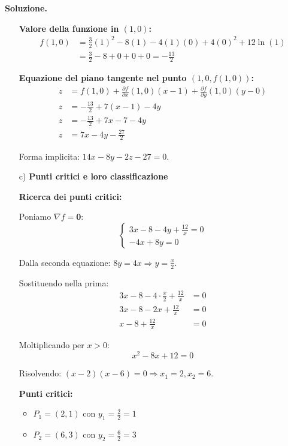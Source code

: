 \documentclass[12pt, a4paper]{article}
\newenvironment{solution}{%
    \par\noindent\textbf{Soluzione.}\medskip\par
    \normalfont
}{\par\bigskip}
\begin{document}
\begin{solution}
\begin{enumerate}
    \textbf{Valore della funzione in $(1,0)$:}
    \begin{align}
        f(1,0) &= \frac{3}{2}(1)^2 - 8(1) - 4(1)(0) + 4(0)^2 + 12 \ln(1) \\
        &= \frac{3}{2} - 8 + 0 + 0 + 0 = -\frac{13}{2}
    \end{align}
    
    \textbf{Equazione del piano tangente nel punto $(1,0,f(1,0))$:}
    \begin{align}
        z &= f(1,0) + \frac{\partial f}{\partial x}(1,0)(x-1) + \frac{\partial f}{\partial y}(1,0)(y-0) \\
        z &= -\frac{13}{2} + 7(x-1) - 4y \\
        z &= -\frac{13}{2} + 7x - 7 - 4y \\
        z &= 7x - 4y - \frac{27}{2}
    \end{align}
    
    Forma implicita: $14x - 8y - 2z - 27 = 0$.

    \item[c)] \textbf{Punti critici e loro classificazione}
    
    \textbf{Ricerca dei punti critici:}
    
    Poniamo $\nabla f = \mathbf{0}$:
    \[\begin{cases} 
    3x - 8 - 4y + \frac{12}{x} = 0 \\ 
    -4x + 8y = 0 
    \end{cases}\]
    
    Dalla seconda equazione: $8y = 4x \Rightarrow y = \frac{x}{2}$.
    
    Sostituendo nella prima:
    \begin{align}
        3x - 8 - 4 \cdot \frac{x}{2} + \frac{12}{x} &= 0 \\
        3x - 8 - 2x + \frac{12}{x} &= 0 \\
        x - 8 + \frac{12}{x} &= 0
    \end{align}
    
    Moltiplicando per $x > 0$:
    \[x^2 - 8x + 12 = 0\]
    
    Risolvendo: $(x-2)(x-6) = 0 \Rightarrow x_1 = 2, x_2 = 6$.
    
    \textbf{Punti critici:}
    \begin{itemize}
        \item $P_1 = (2, 1)$ con $y_1 = \frac{2}{2} = 1$
        \item $P_2 = (6, 3)$ con $y_2 = \frac{6}{2} = 3$
    \end{itemize}
    

\end{enumerate}
\end{solution}
\end{document}
